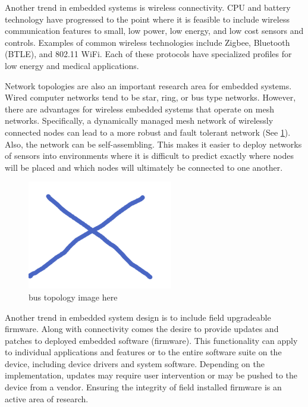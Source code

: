 \documentclass[final,conference,11pt]{IEEEtran}
\begin{document}
Another trend in embedded systems is wireless connectivity.  CPU and battery technology have progressed to the point where it is feasible to include wireless communication features to small, low power, low energy, and low cost sensors and controls.  Examples of common wireless technologies include Zigbee, Bluetooth (BTLE), and 802.11 WiFi.  Each of these protocols have specialized profiles for low energy and medical applications.

Network topologies are also an important research area for embedded systems.  Wired computer networks tend to be star, ring, or bus type networks.  However, there are advantages for wireless embedded systems that operate on mesh networks.  Specifically, a dynamically managed mesh network of wirelessly connected nodes can lead to a more robust and fault tolerant network (See \figurename \ref{fig:topology}).  Also, the network can be self-assembling.  This makes it easier to deploy networks of sensors into environments where it is difficult to predict exactly where nodes will be placed and which nodes will ultimately be connected to one another.\cite{Vasserman2013}

\begin{figure}[!t]
\centering
\includegraphics[width=2.5in]{topology}
\caption{bus topology image here}
\label{fig:topology}
\end{figure}

Another trend in embedded system design is to include field upgradeable firmware.  Along with connectivity comes the desire to provide updates and patches to deployed embedded software (firmware).  This functionality can apply to individual applications and features or to the entire software suite on the device, including device drivers and system software.  Depending on the implementation, updates may require user intervention or may be pushed to the device from a vendor.  Ensuring the integrity of field installed firmware is an active area of research.
\end{document}
